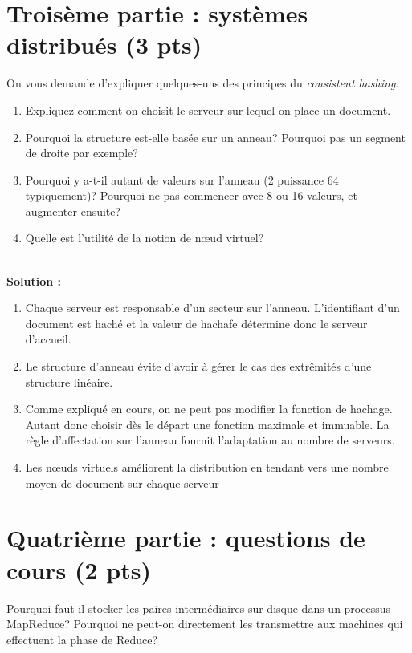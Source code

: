 \documentclass[11pt,a4paper]{article}
\newenvironment{solution}[0]{
~\\ \color{red} \textbf{Solution : }\color{black}}{%
}
\begin{document}
\section*{Troisème partie : systèmes distribués (3 pts)}

On vous demande d'expliquer quelques-uns des principes du \textit{consistent hashing}. 

\begin{enumerate}
   \item Expliquez comment on choisit le serveur sur lequel on place un document.
  \item Pourquoi la structure est-elle basée sur un anneau? Pourquoi pas un segment de droite par exemple?
  \item Pourquoi y a-t-il autant de valeurs sur l'anneau (2 puissance 64 typiquement)? Pourquoi ne pas commencer
      avec 8 ou 16 valeurs, et augmenter ensuite?
   \item Quelle est l'utilité de la notion de n{\oe}ud virtuel?
\end{enumerate}

\begin{solution}

	\begin{enumerate}
	   \item Chaque serveur est responsable d'un secteur sur l'anneau. L'identifiant
	       d'un document est haché et la valeur de hachafe détermine donc le serveur d'accueil.
		   
	  \item Le structure d'anneau évite d'avoir à gérer le cas des extrêmités d'une structure linéaire. 
	  \item Comme expliqué en cours, on ne peut pas modifier la fonction de hachage. Autant donc
	      choisir dès le départ une fonction maximale et immuable. La règle
		   d'affectation sur l'anneau fournit l'adaptation au nombre de serveurs.
	   \item Les n{\oe}uds virtuels améliorent la distribution en tendant vers
	     une nombre moyen de document sur chaque serveur
	\end{enumerate}

\end{solution}
\section*{Quatrième partie : questions de cours (2 pts)}

 Pourquoi faut-il stocker les paires intermédiaires sur disque dans un processus
 MapReduce? Pourquoi ne peut-on directement les transmettre aux machines qui effectuent
 la phase de Reduce?
 
\end{document}

